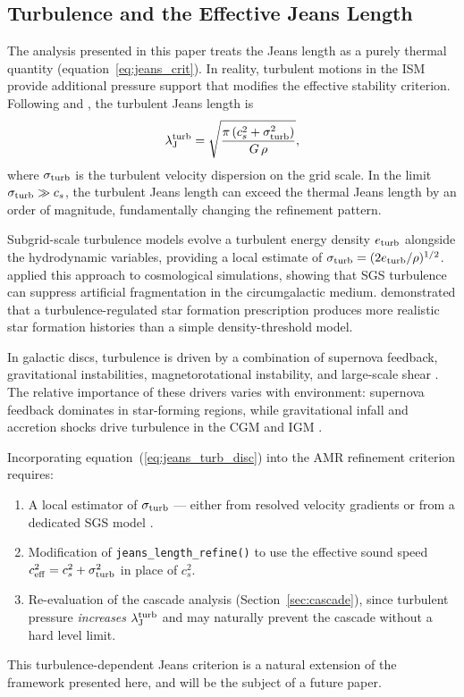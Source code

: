 \documentclass[fleqn,usenatbib]{mnras}
\newcommand{\lJ}{\lambda_{\rm J}}
\newcommand{\code}[1]{\texttt{#1}}
\begin{document}
\subsection{Turbulence and the Effective Jeans Length}
\label{sec:turbulence}

The analysis presented in this paper treats the Jeans length as a
purely thermal quantity (equation~\ref{eq:jeans_crit}).  In reality,
turbulent motions in the ISM provide additional pressure support that
modifies the effective stability criterion.  Following
\citet{Chandrasekhar1951} and \citet{Bonazzola1987}, the turbulent
Jeans length is
\begin{equation}
  \lJ^{\rm turb} =
  \sqrt{\frac{\pi\,(c_s^2 + \sigma_{\rm turb}^2)}{G\,\rho}},
  \label{eq:jeans_turb_disc}
\end{equation}
where $\sigma_{\rm turb}$ is the turbulent velocity dispersion on the
grid scale.  In the limit $\sigma_{\rm turb} \gg c_s$, the turbulent
Jeans length can exceed the thermal Jeans length by an order of
magnitude, fundamentally changing the refinement pattern.

Subgrid-scale turbulence models \citep{Schmidt2006, Schmidt2011}
evolve a turbulent energy density $e_{\rm turb}$ alongside the
hydrodynamic variables, providing a local estimate of $\sigma_{\rm
turb} = (2 e_{\rm turb}/\rho)^{1/2}$.  \citet{Rennehan2021} applied
this approach to cosmological simulations, showing that SGS turbulence
can suppress artificial fragmentation in the circumgalactic medium.
\citet{Semenov2016} demonstrated that a turbulence-regulated star
formation prescription produces more realistic star formation
histories than a simple density-threshold model.

In galactic discs, turbulence is driven by a combination of supernova
feedback, gravitational instabilities, magnetorotational instability,
and large-scale shear \citep{Robertson2008, Kim2017, Hopkins2018}.
The relative importance of these drivers varies with environment:
supernova feedback dominates in star-forming regions, while
gravitational infall and accretion shocks drive turbulence in the CGM
and IGM \citep{Iapichino2011}.

Incorporating equation~(\ref{eq:jeans_turb_disc}) into the AMR
refinement criterion requires:
\begin{enumerate}
  \item A local estimator of $\sigma_{\rm turb}$ --- either from
    resolved velocity gradients \citep{Federrath2012} or from a
    dedicated SGS model \citep{Schmidt2006, Rennehan2021}.
  \item Modification of \code{jeans\_length\_refine()} to use the
    effective sound speed $c_{\rm eff}^2 = c_s^2 + \sigma_{\rm turb}^2$
    in place of $c_s^2$.
  \item Re-evaluation of the cascade analysis
    (Section~\ref{sec:cascade}), since turbulent pressure
    \emph{increases} $\lJ^{\rm turb}$ and may naturally prevent the
    cascade without a hard level limit.
\end{enumerate}
This turbulence-dependent Jeans criterion is a natural extension of
the framework presented here, and will be the subject of a future
paper.
\end{document}
